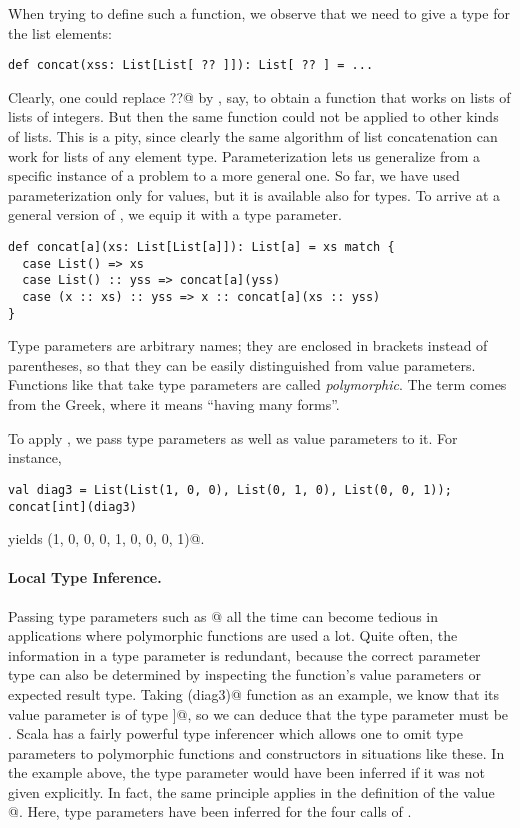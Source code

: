 \documentclass[11pt]{book}
\begin{document}
When trying to define such a function, we observe that we need to give
a type for the list elements:
\begin{verbatim}
def concat(xss: List[List[ ?? ]]): List[ ?? ] = ...
\end{verbatim}
Clearly, one could replace \verb@??@ by \verb@int@, say, to obtain a
function \verb@concat@ that works on lists of lists of integers. But then the
same function could not be applied to other kinds of lists. This is a
pity, since clearly the same algorithm of list concatenation can work
for lists of any element type. Parameterization lets us generalize
from a specific instance of a problem to a more general one. So far,
we have used parameterization only for values, but it is available
also for types. To arrive at a general version of \verb@concat@, we 
equip it with a type parameter.
\begin{verbatim}
def concat[a](xs: List[List[a]]): List[a] = xs match {
  case List() => xs
  case List() :: yss => concat[a](yss)
  case (x :: xs) :: yss => x :: concat[a](xs :: yss)
}
\end{verbatim}
Type parameters are arbitrary names; they are enclosed in brackets
instead of parentheses, so that they can be easily distinguished from
value parameters. Functions like \verb@concat@ that take type
parameters are called {\em polymorphic}. The term comes from the
Greek, where it means ``having many forms''.

To apply \verb@concat@, we pass type parameters as well as value
parameters to it. For instance,
\begin{verbatim}
val diag3 = List(List(1, 0, 0), List(0, 1, 0), List(0, 0, 1));
concat[int](diag3)
\end{verbatim}
yields \verb@List(1, 0, 0, 0, 1, 0, 0, 0, 1)@.

\paragraph{Local Type Inference.}
Passing type parameters such as \verb@[int]@ all the time can become
tedious in applications where polymorphic functions are used a
lot. Quite often, the information in a type parameter is redundant,
because the correct parameter type can also be determined by
inspecting the function's value parameters or expected result type.
Taking \verb@concat[int](diag3)@ function as an example, we know that
its value parameter is of type \verb@List[List[int]]@, so we can
deduce that the type parameter must be \verb@int@. Scala has a
fairly powerful type inferencer which allows one to omit type
parameters to polymorphic functions and constructors in situations
like these.  In the example above, the \verb@int@ type parameter would
have been inferred if it was not given explicitly. In fact, the same
principle applies in the definition of the value @. 
Here, type parameters have been inferred for the four calls of
\verb@List@. 
\end{document}
